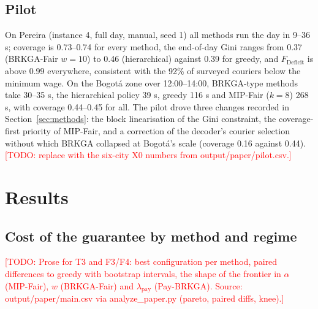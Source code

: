 \documentclass[preprint,12pt,authoryear]{elsarticle}%
\newcommand{\todo}[1]{\textcolor{red}{[TODO: #1]}}
\newcommand{\FD}{F_{\text{Deficit}}}
\begin{document}
\subsection{Pilot}

On Pereira (instance 4, full day, manual, seed 1) all methods run the day in 9--36 s; coverage is 0.73--0.74 for every method, the end-of-day Gini ranges from 0.37 (BRKGA-Fair $w=10$) to 0.46 (hierarchical) against 0.39 for greedy, and $\FD$ is above 0.99 everywhere, consistent with the 92\% of surveyed couriers below the minimum wage. On the Bogot\'a zone over 12:00--14:00, BRKGA-type methods take 30--35 s, the hierarchical policy 39 s, greedy 116 s and MIP-Fair ($k = 8$) 268 s, with coverage 0.44--0.45 for all. The pilot drove three changes recorded in Section~\ref{sec:methods}: the block linearisation of the Gini constraint, the coverage-first priority of MIP-Fair, and a correction of the decoder's courier selection without which BRKGA collapsed at Bogot\'a's scale (coverage 0.16 against 0.44). \todo{replace with the six-city X0 numbers from output/paper/pilot.csv.}

\section{Results}
\label{sec:results}

\subsection{Cost of the guarantee by method and regime}

\todo{Prose for T3 and F3/F4: best configuration per method, paired differences to greedy with bootstrap intervals, the shape of the frontier in $\alpha$ (MIP-Fair), $w$ (BRKGA-Fair) and $\lambda_{\text{pay}}$ (Pay-BRKGA). Source: output/paper/main.csv via analyze\_paper.py (pareto, paired diffs, knee).}
\end{document}
